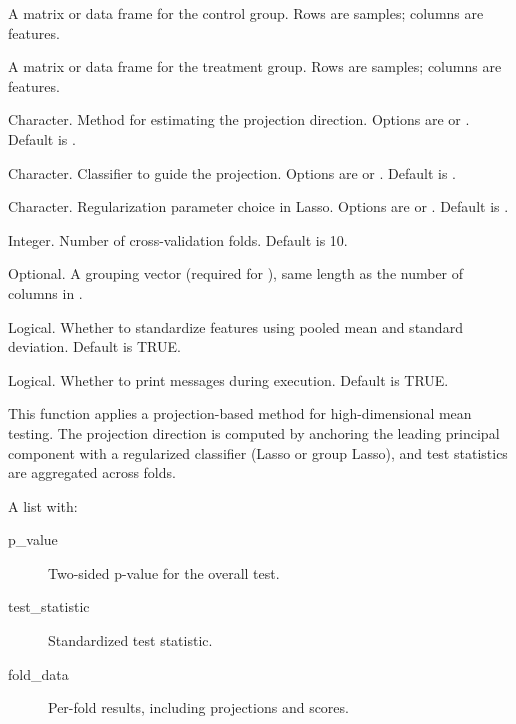 \documentclass[a4paper]{book}
\begin{document}
\begin{Arguments}
\begin{ldescription}
\item[\code{control}] A matrix or data frame for the control group. Rows are samples; columns are features.

\item[\code{treatment}] A matrix or data frame for the treatment group. Rows are samples; columns are features.

\item[\code{pca\_method}] Character. Method for estimating the projection direction. Options are  or . Default is .

\item[\code{classifier\_method}] Character. Classifier to guide the projection. Options are  or . Default is .

\item[\code{lambda\_type}] Character. Regularization parameter choice in Lasso. Options are  or . Default is .

\item[\code{n\_folds}] Integer. Number of cross-validation folds. Default is 10.

\item[\code{group}] Optional. A grouping vector (required for ), same length as the number of columns in .

\item[\code{standardize\_feature}] Logical. Whether to standardize features using pooled mean and standard deviation. Default is TRUE.

\item[\code{verbose}] Logical. Whether to print messages during execution. Default is TRUE.
\end{ldescription}
\end{Arguments}
%
\begin{Details}
This function applies a projection-based method for high-dimensional mean testing. The projection direction is computed by anchoring the leading principal component with a regularized classifier (Lasso or group Lasso), and test statistics are aggregated across folds.
\end{Details}
%
\begin{Value}
A list with:
\begin{description}

\item[p\_value] Two-sided p-value for the overall test.
\item[test\_statistic] Standardized test statistic.
\item[fold\_data] Per-fold results, including projections and scores.

\end{description}

\end{Value}
\end{document}
